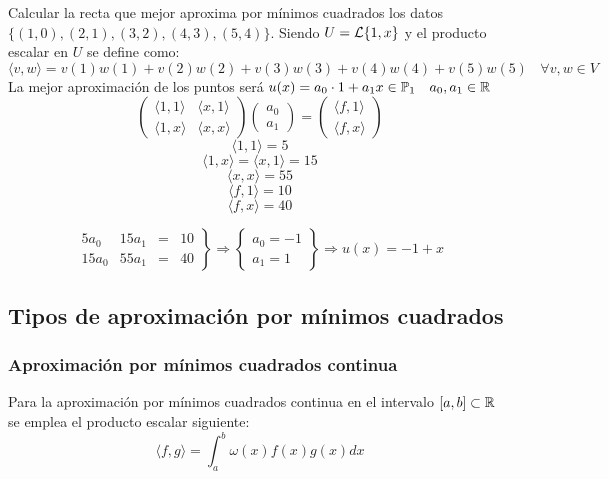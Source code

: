 \begin{ejemplo}
    Calcular la recta que mejor aproxima por mínimos cuadrados los datos $\{(1,0),(2,1),(3,2),(4,3),(5,4)\}$.
Siendo $U=\mathcal{L}\{1,x\}$ y el producto escalar en $U$ se define como:
$$\langle v,w \rangle = v(1)w(1) + v(2)w(2) + v(3)w(3) + v(4)w(4) + v(5)w(5)~~~~\forall v,w \in V$$
La mejor aproximación de los puntos será $u(x) = a_0 \cdot 1 + a_1x \in \mathbb{P}_1~~~a_0,a_1 \in \mathbb R$
$$\left( \begin{array}{cc}
            \langle 1,1 \rangle & \langle x,1 \rangle \\
            \langle 1,x \rangle & \langle x,x \rangle
        \end{array} \right) \left( \begin{array}{c}
            a_0 \\
            a_1
        \end{array} \right) = \left( \begin{array}{c}
            \langle f,1 \rangle \\
            \langle f,x \rangle
        \end{array} \right)$$
$$\langle 1,1 \rangle = 5$$
$$\langle 1,x \rangle = \langle x,1 \rangle = 15$$
$$\langle x,x \rangle = 55 $$
$$\langle f,1 \rangle = 10$$
$$\langle f,x \rangle = 40$$

$$\left. \begin{array}{cccc}
        5a_0  & 15a_1 & = & 10 \\
        15a_0 & 55a_1 & = & 40
    \end{array} \right\} \Rightarrow \left\{ \begin{array}{c}
        a_0 = -1 \\
        a_1 = 1
    \end{array} \right\} \Rightarrow u(x) = -1+x$$
\end{ejemplo}



\subsection{Tipos de aproximación por mínimos cuadrados}
\noindent
\subsubsection{Aproximación por mínimos cuadrados continua}

Para la aproximación por mínimos cuadrados continua en el intervalo $[a,b]\subset \mathbb{R}$ se emplea el producto escalar siguiente:
\begin{equation*}
    \langle f,g\rangle = \int_{a}^b \omega(x)f(x)g(x)dx
\end{equation*}

